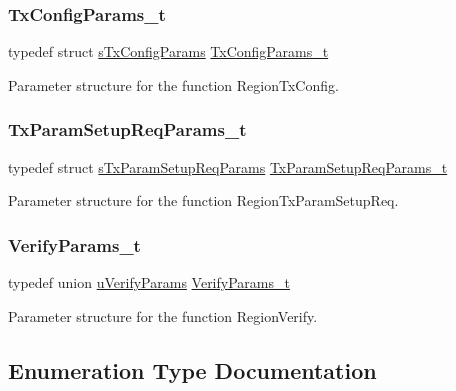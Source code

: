 \subsubsection{\texorpdfstring{Tx\+Config\+Params\+\_\+t}{TxConfigParams\_t}}
{\footnotesize\ttfamily typedef struct \hyperlink{structsTxConfigParams}{s\+Tx\+Config\+Params} \hyperlink{group__REGION_gabed730d4d04b0b60d4b6d1966d3f21d3}{Tx\+Config\+Params\+\_\+t}}

Parameter structure for the function Region\+Tx\+Config. \mbox{\label{group__REGION_ga26836ef2996e70410e42ef471073f855}} 
\subsubsection{\texorpdfstring{Tx\+Param\+Setup\+Req\+Params\+\_\+t}{TxParamSetupReqParams\_t}}
{\footnotesize\ttfamily typedef struct \hyperlink{structsTxParamSetupReqParams}{s\+Tx\+Param\+Setup\+Req\+Params} \hyperlink{group__REGION_ga26836ef2996e70410e42ef471073f855}{Tx\+Param\+Setup\+Req\+Params\+\_\+t}}

Parameter structure for the function Region\+Tx\+Param\+Setup\+Req. \mbox{\label{group__REGION_ga966d97bc2f25df1c09e92e60ef652276}} 
\subsubsection{\texorpdfstring{Verify\+Params\+\_\+t}{VerifyParams\_t}}
{\footnotesize\ttfamily typedef union \hyperlink{unionuVerifyParams}{u\+Verify\+Params} \hyperlink{group__REGION_ga966d97bc2f25df1c09e92e60ef652276}{Verify\+Params\+\_\+t}}

Parameter structure for the function Region\+Verify. 

\subsection{Enumeration Type Documentation}
\mbox{\label{group__REGION_ga7a62e669f567fc160ad58210664bca9c}} 
